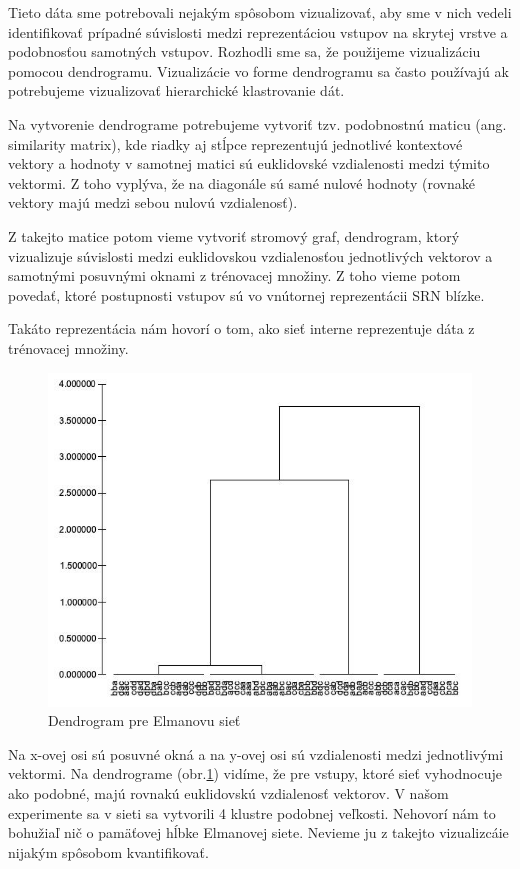 Tieto dáta sme potrebovali nejakým spôsobom vizualizovať, aby sme v nich vedeli identifikovať prípadné súvislosti medzi reprezentáciou vstupov na skrytej vrstve a 
podobnosťou samotných vstupov.
Rozhodli sme sa, že použijeme vizualizáciu pomocou dendrogramu.
Vizualizácie vo forme dendrogramu sa často používajú ak potrebujeme vizualizovať hierarchické klastrovanie dát.

Na vytvorenie dendrograme potrebujeme vytvoriť tzv. podobnostnú maticu (ang. similarity matrix), kde 
riadky aj stĺpce reprezentujú jednotlivé kontextové vektory a hodnoty v samotnej matici sú euklidovské vzdialenosti medzi týmito vektormi.
Z toho vyplýva, že na diagonále sú samé nulové hodnoty (rovnaké vektory majú medzi sebou nulovú vzdialenosť).

Z takejto matice potom vieme vytvoriť stromový graf, dendrogram, ktorý vizualizuje súvislosti medzi euklidovskou vzdialenosťou jednotlivých vektorov a samotnými posuvnými oknami z trénovacej množiny.
Z toho vieme potom povedať, ktoré postupnosti vstupov sú vo vnútornej reprezentácii SRN blízke. 

Takáto reprezentácia nám hovorí o tom, ako sieť interne reprezentuje dáta z trénovacej množiny.

\begin{figure}[H]
    \centering
    \includegraphics[width=\textwidth]{assets/dendrogram}
    \caption{Dendrogram pre Elmanovu sieť}
    \label{dendrogram}
\end{figure}
Na x-ovej osi sú posuvné okná a na y-ovej osi sú vzdialenosti medzi jednotlivými vektormi.
Na dendrograme (obr.\ref{dendrogram}) vidíme, že pre vstupy, ktoré sieť vyhodnocuje ako podobné, majú rovnakú euklidovskú vzdialenosť vektorov.
V našom experimente sa v sieti sa vytvorili 4 klustre podobnej veľkosti. Nehovorí nám to bohužiaľ nič o pamäťovej hĺbke Elmanovej siete.
Nevieme ju z takejto vizualizcáie nijakým spôsobom kvantifikovať.

